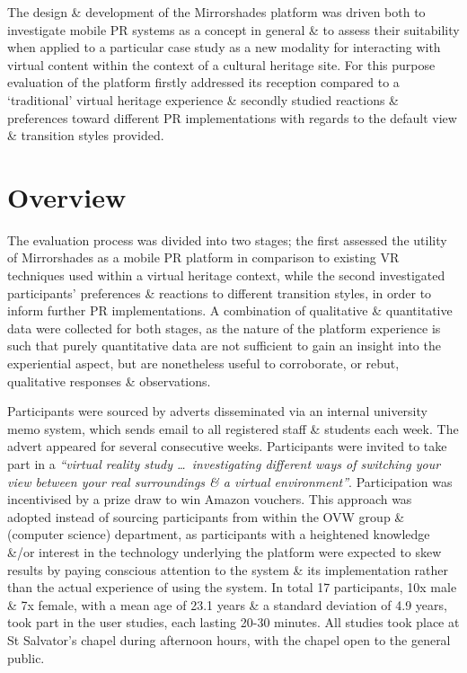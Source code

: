 The design \& development of the Mirrorshades platform was driven both to investigate mobile PR systems as a concept in general \& to assess their suitability when applied to a particular case study as a new modality for interacting with virtual content within the context of a cultural heritage site. For this purpose evaluation of the platform firstly addressed its reception compared to a `traditional' virtual heritage experience \& secondly studied reactions \& preferences toward different PR implementations with regards to the default view \& transition styles provided.




\section{Overview}

The evaluation process was divided into two stages; the first assessed the utility of Mirrorshades as a mobile PR platform in comparison to existing VR techniques used within a virtual heritage context, while the second investigated participants' preferences \& reactions to different transition styles, in order to inform further PR implementations. A combination of qualitative \& quantitative data were collected for both stages, as the nature of the platform experience is such that purely quantitative data are not sufficient to gain an insight into the experiential aspect, but are nonetheless useful to corroborate, or rebut, qualitative responses \& observations.

Participants were sourced by adverts disseminated via an internal university memo system, which sends email to all registered staff \& students each week. The advert appeared for several consecutive weeks. Participants were invited to take part in a \textit{``virtual reality study \ldots\ investigating different ways of switching your view between your real surroundings \& a virtual environment''}. Participation was incentivised by a prize draw to win Amazon vouchers. This approach was adopted instead of sourcing participants from within the OVW group \& (computer science) department, as participants with a heightened knowledge \&/or interest in the technology underlying the platform were expected to skew results by paying conscious attention to the system \& its implementation rather than the actual experience of using the system. In total 17 participants, 10x male \& 7x female, with a mean age of 23.1 years \& a standard deviation of 4.9 years, took part in the user studies, each lasting 20-30 minutes. All studies took place at St Salvator's chapel during afternoon hours, with the chapel open to the general public.

